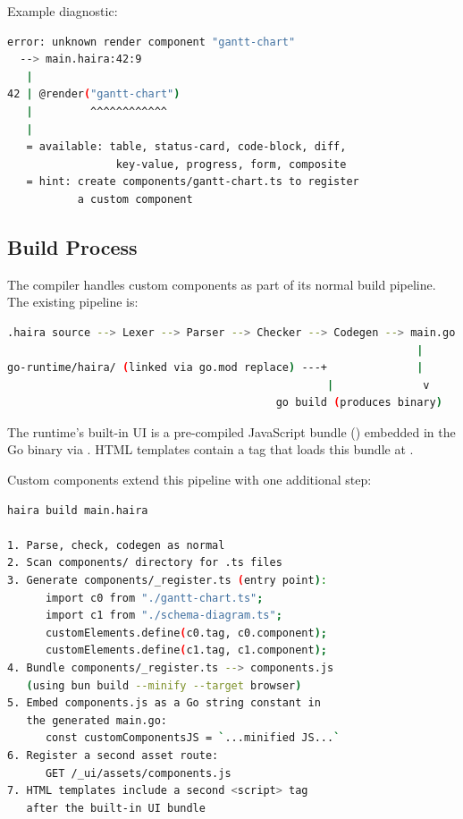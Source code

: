Example diagnostic:

\begin{lstlisting}[language=bash,numbers=none]
error: unknown render component "gantt-chart"
  --> main.haira:42:9
   |
42 | @render("gantt-chart")
   |         ^^^^^^^^^^^^
   |
   = available: table, status-card, code-block, diff,
                 key-value, progress, form, composite
   = hint: create components/gantt-chart.ts to register
           a custom component
\end{lstlisting}

\subsection{Build Process}

The \haira{} compiler handles custom components as part of its normal build pipeline. The existing pipeline is:

\begin{lstlisting}[language=bash,numbers=none]
.haira source --> Lexer --> Parser --> Checker --> Codegen --> main.go
                                                                |
go-runtime/haira/ (linked via go.mod replace) ---+              |
                                                  |              v
                                          go build (produces binary)
\end{lstlisting}

The runtime's built-in UI is a pre-compiled JavaScript bundle () embedded in the Go binary via . HTML templates contain a  tag that loads this bundle at .

Custom components extend this pipeline with one additional step:

\begin{lstlisting}[language=bash,numbers=none]
haira build main.haira

1. Parse, check, codegen as normal
2. Scan components/ directory for .ts files
3. Generate components/_register.ts (entry point):
      import c0 from "./gantt-chart.ts";
      import c1 from "./schema-diagram.ts";
      customElements.define(c0.tag, c0.component);
      customElements.define(c1.tag, c1.component);
4. Bundle components/_register.ts --> components.js
   (using bun build --minify --target browser)
5. Embed components.js as a Go string constant in
   the generated main.go:
      const customComponentsJS = `...minified JS...`
6. Register a second asset route:
      GET /_ui/assets/components.js
7. HTML templates include a second <script> tag
   after the built-in UI bundle
\end{lstlisting}

